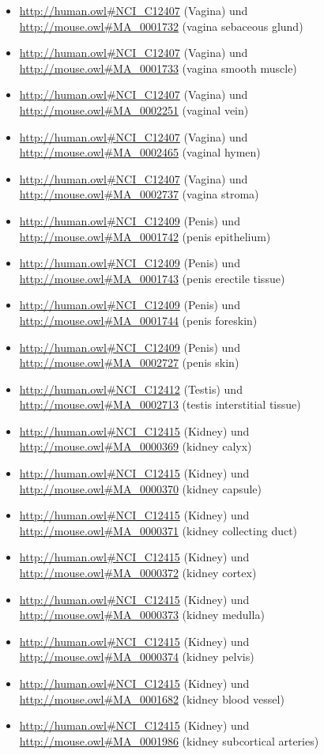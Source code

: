 \begin{itemize}
	\item \url{http://human.owl#NCI_C12407} (Vagina) und \url{http://mouse.owl#MA_0001732} (vagina sebaceous glund)
	\item \url{http://human.owl#NCI_C12407} (Vagina) und \url{http://mouse.owl#MA_0001733} (vagina smooth muscle)
	\item \url{http://human.owl#NCI_C12407} (Vagina) und \url{http://mouse.owl#MA_0002251} (vaginal vein)
	\item \url{http://human.owl#NCI_C12407} (Vagina) und \url{http://mouse.owl#MA_0002465} (vaginal hymen)
	\item \url{http://human.owl#NCI_C12407} (Vagina) und \url{http://mouse.owl#MA_0002737} (vagina stroma)
	\item \url{http://human.owl#NCI_C12409} (Penis) und \url{http://mouse.owl#MA_0001742} (penis epithelium)
	\item \url{http://human.owl#NCI_C12409} (Penis) und \url{http://mouse.owl#MA_0001743} (penis erectile tissue)
	\item \url{http://human.owl#NCI_C12409} (Penis) und \url{http://mouse.owl#MA_0001744} (penis foreskin)
	\item \url{http://human.owl#NCI_C12409} (Penis) und \url{http://mouse.owl#MA_0002727} (penis skin)
	\item \url{http://human.owl#NCI_C12412} (Testis) und \url{http://mouse.owl#MA_0002713} (testis interstitial tissue)
	\item \url{http://human.owl#NCI_C12415} (Kidney) und \url{http://mouse.owl#MA_0000369} (kidney calyx)
	\item \url{http://human.owl#NCI_C12415} (Kidney) und \url{http://mouse.owl#MA_0000370} (kidney capsule)
	\item \url{http://human.owl#NCI_C12415} (Kidney) und \url{http://mouse.owl#MA_0000371} (kidney collecting duct)
	\item \url{http://human.owl#NCI_C12415} (Kidney) und \url{http://mouse.owl#MA_0000372} (kidney cortex)
	\item \url{http://human.owl#NCI_C12415} (Kidney) und \url{http://mouse.owl#MA_0000373} (kidney medulla)
	\item \url{http://human.owl#NCI_C12415} (Kidney) und \url{http://mouse.owl#MA_0000374} (kidney pelvis)
	\item \url{http://human.owl#NCI_C12415} (Kidney) und \url{http://mouse.owl#MA_0001682} (kidney blood vessel)
	\item \url{http://human.owl#NCI_C12415} (Kidney) und \url{http://mouse.owl#MA_0001986} (kidney subcortical arteries)

\end{itemize}
